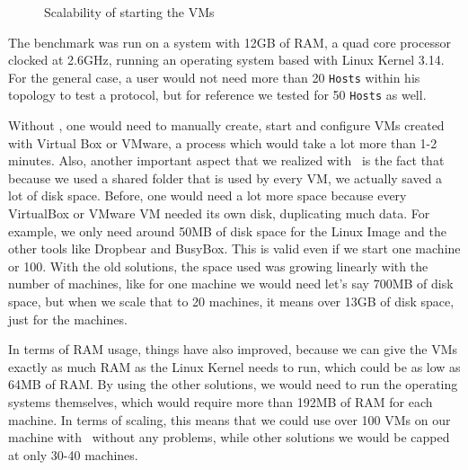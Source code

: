 \begin{figure}[htb]
	\begin{center}
	\caption{Scalability of starting the VMs \label{img:time-for-starting-vms}}
	\end{center}
\end{figure}

The benchmark was run on a system with 12GB of RAM, a quad core processor clocked at 2.6GHz, running an operating system based with Linux Kernel 3.14.
For the general case, a user would not need more than 20 \texttt{Hosts} within his topology to test a protocol, but for reference we tested for 50 \texttt{Hosts} as well.

Without \project, one would need to manually create, start and configure VMs created with Virtual Box or VMware, a process which would take a lot more than 1-2 minutes.
Also, another important aspect that we realized with \project\ is the fact that because we used a shared folder that is used by every VM, we actually saved a lot of disk space.
Before, one would need a lot more space because every VirtualBox or VMware VM needed its own disk, duplicating much data.
For example, we only need around 50MB of disk space for the Linux Image and the other tools like Dropbear and BusyBox.
This is valid even if we start one machine or 100.
With the old solutions, the space used was growing linearly with the number of machines, like for one machine we would need let's say 700MB of disk space, but when we scale that to 20 machines, it means over 13GB of disk space, just for the machines.

In terms of RAM usage, things have also improved, because we can give the VMs exactly as much RAM as the Linux Kernel needs to run, which could be as low as 64MB of RAM.
By using the other solutions, we would need to run the operating systems themselves, which would require more than 192MB of RAM for each machine.
In terms of scaling, this means that we could use over 100 VMs on our machine with \project\ without any problems, while other solutions we would be capped at only 30-40 machines.
